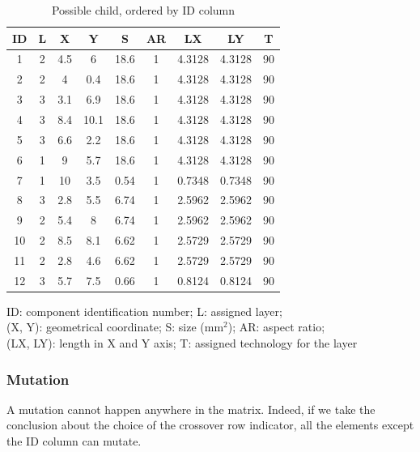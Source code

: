 \begin{table}[pt]
\caption{Possible child, ordered by ID column}
\begin{center}
\begin{scriptsize}
\begin{tabular}{|c|c|c|c|c|c|c|c|c|}
\hline ID & L & X & Y & S & AR & LX & LY & T\\
\hline 1 & 2 & 4.5 & 6 & 18.6 & 1 & 4.3128 & 4.3128 & 90\\
2 & 2 & 4 & 0.4 & 18.6 & 1 & 4.3128 & 4.3128 & 90\\
3 & 3 & 3.1 & 6.9 & 18.6 & 1 & 4.3128 & 4.3128 & 90\\
4 & 3 & 8.4 & 10.1 & 18.6 & 1 & 4.3128 & 4.3128 & 90\\
5 & 3 & 6.6 & 2.2 & 18.6 & 1 & 4.3128 & 4.3128 & 90\\
6 & 1 & 9 & 5.7 & 18.6 & 1 & 4.3128 & 4.3128 & 90\\
7 & 1 & 10 & 3.5 & 0.54 & 1 & 0.7348 & 0.7348 & 90\\
8 & 3 & 2.8 & 5.5 & 6.74 & 1 & 2.5962 & 2.5962 & 90\\
9 & 2 & 5.4 & 8 & 6.74 & 1 & 2.5962 & 2.5962 & 90\\
10 & 2 & 8.5 & 8.1 & 6.62 & 1 & 2.5729 & 2.5729 & 90\\
11 & 2 & 2.8 & 4.6 & 6.62 & 1 & 2.5729 & 2.5729 & 90\\
12 & 3 & 5.7 & 7.5 & 0.66 & 1 & 0.8124 & 0.8124 & 90\\
\hline
\end{tabular}
\end{scriptsize}
\end{center}
\begin{center}
\begin{scriptsize}
ID: component identification number; L: assigned layer;\\
(X, Y): geometrical coordinate; S: size (mm$^2$); AR: aspect ratio;\\
(LX, LY): length in X and Y axis; T: assigned technology for the layer
\end{scriptsize}
\end{center}
\label{tab:childIDrow}
\end{table}

\subsubsection*{Mutation}
A mutation cannot happen anywhere in the matrix. Indeed, if we take the conclusion about the choice of the crossover row indicator, all the elements except the ID column can mutate.

